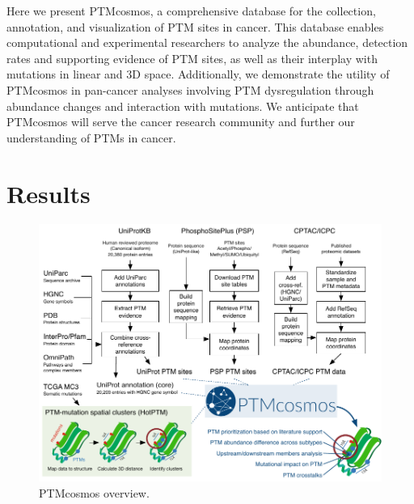 Here we present PTMcosmos, a comprehensive database for the collection, annotation, and visualization of PTM sites in cancer. This database enables computational and experimental researchers to analyze the abundance, detection rates and supporting evidence of PTM sites, as well as their interplay with mutations in linear and 3D space. Additionally, we demonstrate the utility of PTMcosmos in pan-cancer analyses involving PTM dysregulation through abundance changes and interaction with mutations. We anticipate that PTMcosmos will serve the cancer research community and further our understanding of PTMs in cancer.



\section{Results}


\begin{figure}[tb]
    \centering
    \includegraphics[width=0.9\linewidth]{figures/chap03_ptmcosmos/figure1_ptmcosmos_workflow.pdf}
    \caption[PTMcosmos overview.]{PTMcosmos overview.}
    \label{fig:ptmcosmos-workflow}
\end{figure}

